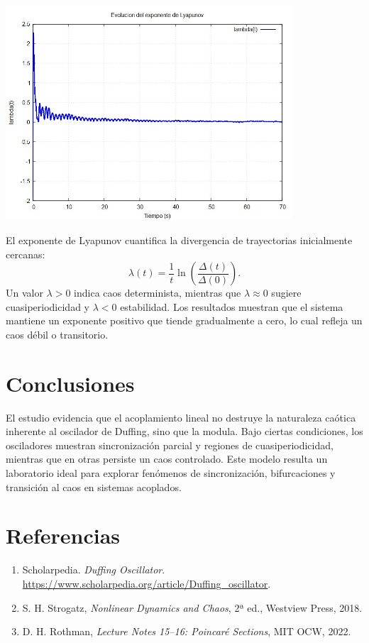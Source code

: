 \documentclass[12pt,a4paper]{article}
\begin{document}
\vspace{1em}
\begin{center}
\includegraphics[width=0.8\textwidth]{figs/lyapunov_placeholder.png}
\end{center}
\vspace{1em}

El exponente de Lyapunov cuantifica la divergencia de trayectorias inicialmente cercanas:
\[
\lambda(t) = \frac{1}{t} \ln \left( \frac{\Delta(t)}{\Delta(0)} \right).
\]
Un valor $\lambda > 0$ indica caos determinista, mientras que $\lambda \approx 0$ sugiere cuasiperiodicidad y $\lambda < 0$ estabilidad. Los resultados muestran que el sistema mantiene un exponente positivo que tiende gradualmente a cero, lo cual refleja un caos débil o transitorio.

\section{Conclusiones}

El estudio evidencia que el acoplamiento lineal no destruye la naturaleza caótica inherente al oscilador de Duffing, sino que la modula. Bajo ciertas condiciones, los osciladores muestran sincronización parcial y regiones de cuasiperiodicidad, mientras que en otras persiste un caos controlado. Este modelo resulta un laboratorio ideal para explorar fenómenos de sincronización, bifurcaciones y transición al caos en sistemas acoplados.

\section*{Referencias}
\begin{enumerate}
    \item Scholarpedia. \textit{Duffing Oscillator}. \url{https://www.scholarpedia.org/article/Duffing_oscillator}.
    \item S. H. Strogatz, \textit{Nonlinear Dynamics and Chaos}, 2ª ed., Westview Press, 2018.
    \item D. H. Rothman, \textit{Lecture Notes 15–16: Poincaré Sections}, MIT OCW, 2022.
\end{enumerate}
\end{document}
